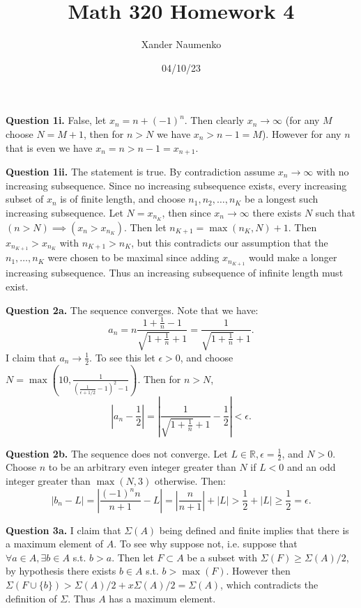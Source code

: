 \documentclass[letterpaper, reqno,11pt]{article}
\begin{document}
\title{Math 320 Homework 4}
\date{04/10/23}
\author{Xander Naumenko}
\maketitle

{\medskip\noindent\bf Question 1i.} False, let $x_n=n+(-1)^{n}$. Then clearly $x_n\to\infty$ (for any $M$ choose $N=M+1$, then for $n>N$ we have $x_n>n-1=M$). However for any $n$ that is even we have $x_n=n>n-1=x_{n+1}$.

{\medskip\noindent\bf Question 1ii.} The statement is true. By contradiction assume $x_n\to \infty$ with no increasing subsequence. Since no increasing subsequence exists, every increasing subset of $x_n$ is of finite length, and choose $n_1,n_2,\ldots,n_K$ be a longest such increasing subsequence. Let $N=x_{n_K}$, then since $x_n\to\infty$ there exists $N$ such that $(n>N)\implies\left( x_n>x_{n_K} \right) $. Then let $n_{K+1}=\max(n_K,N)+1$. Then $x_{n_{K+1}}>x_{n_K}$ with $n_{K+1}>n_K$, but this contradicts our assumption that the $n_1,\ldots,n_K$ were chosen to be maximal since adding $x_{n_{K+1}}$ would make a longer increasing subsequence. Thus an increasing subsequence of infinite length must exist.

\newpage\phantom{blabla}
\newpage

{\medskip\noindent\bf Question 2a.} The sequence converges. Note that we have:
\[
a_{n}=n \frac{1+\frac{1}{n}-1}{\sqrt{1+\frac{1}{n}}+1}=\frac{1}{\sqrt{1+\frac{1}{n}}+1}
.\]
I claim that $a_n\to \frac{1}{2}$. To see this let $\epsilon>0$, and choose $N=\max\left(10,\frac{1}{\left( \frac{1}{\epsilon+1 /2}-1 \right) ^2-1}\right)$. Then for $n>N$,
\[
|a_n-\frac{1}{2}|=\left| \frac{1}{\sqrt{1+\frac{1}{n}}+1} -\frac{1}{2}\right|<\epsilon
.\]

{\medskip\noindent\bf Question 2b.} The sequence does not converge. Let $L\in \mathbb{R},\epsilon=\frac{1}{2}$, and $N>0$. Choose $n$ to be an arbitrary even integer greater than $N$ if $L<0$ and an odd integer greater than $\max(N, 3)$ otherwise. Then:
\[
\left| b_n-L \right| =\left| \frac{(-1)^{n}n}{n+1}-L \right|=\left| \frac{n}{n+1} \right| +|L|> \frac{1}{2}+|L|\geq \frac{1}{2}=\epsilon
.\]

\newpage\phantom{blabla}
\newpage

{\medskip\noindent\bf Question 3a.} I claim that $\Sigma(A)$ being defined and finite implies that there is a maximum element of $A$. To see why suppose not, i.e. suppose that $\forall a\in A, \exists b\in A$ s.t. $b>a$. Then let $F\subset A$ be a subset with $\Sigma(F)\geq \Sigma(A) /2$, by hypothesis there exists $b\in A$ s.t. $b>\max(F)$. However then $\Sigma(F\cup \{b\})> \Sigma(A) /2+x\Sigma(A) /2=\Sigma(A)$, which contradicts the definition of $\Sigma$. Thus $A$ has a maximum element.
\end{document}
